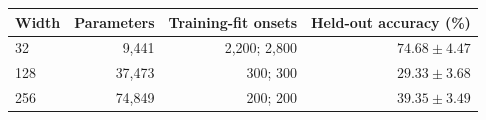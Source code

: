 \begin{tabular}{lrrr}
\toprule
Width & Parameters & Training-fit onsets & Held-out accuracy (\%) \\
\midrule
32 & 9,441 & 2,200; 2,800 & $74.68\pm4.47$ \\
128 & 37,473 & 300; 300 & $29.33\pm3.68$ \\
256 & 74,849 & 200; 200 & $39.35\pm3.49$ \\
\bottomrule
\end{tabular}
